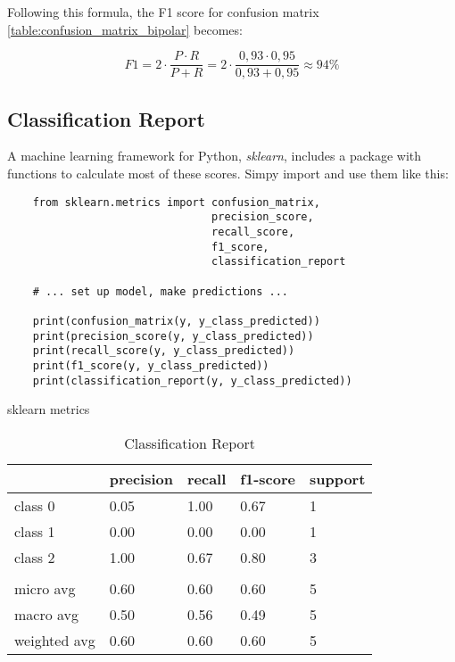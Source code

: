 Following this formula, the F1 score for confusion matrix \ref{table:confusion_matrix_bipolar} becomes:

\[
  F1 = 2 \cdot \frac{P \cdot R}{P + R} = 2 \cdot \frac{0,93 \cdot 0,95}{0,93 + 0,95} \approx 94\%
\]

\subsection{Classification Report}

A machine learning framework for Python, \textit{sklearn}, includes a package with functions to calculate most of these scores. 
Simpy import and use them like this:

\begin{code}
  \begin{verbatim}
    from sklearn.metrics import confusion_matrix, 
                                precision_score, 
                                recall_score, 
                                f1_score, 
                                classification_report

    # ... set up model, make predictions ...

    print(confusion_matrix(y, y_class_predicted))
    print(precision_score(y, y_class_predicted))
    print(recall_score(y, y_class_predicted))
    print(f1_score(y, y_class_predicted))
    print(classification_report(y, y_class_predicted))
  \end{verbatim}
  \caption{sklearn metrics}
  \label{code:sklearn_metrics}
\end{code}

\begin{table}
  \begin{tabular}{| l | l | l | l | l |}
    \hline
                  & precision & recall & f1-score & support \\ \hline
    class 0       & 0.05      & 1.00    & 0.67    & 1       \\
    class 1       & 0.00      & 0.00    & 0.00    & 1       \\
    class 2       & 1.00      & 0.67    & 0.80    & 3       \\
                  &           &         &         &         \\ 
    micro avg     & 0.60      & 0.60    & 0.60    & 5       \\
    macro avg     & 0.50      & 0.56    & 0.49    & 5       \\
    weighted avg  & 0.60      & 0.60    & 0.60    & 5       \\
    \hline
  \end{tabular}
  \caption{Classification Report}
  \label{table:classification_report}
\end{table}

